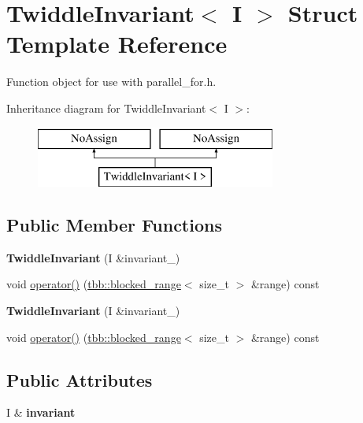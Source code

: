 \hypertarget{structTwiddleInvariant}{}\section{Twiddle\+Invariant$<$ I $>$ Struct Template Reference}
\label{structTwiddleInvariant}


Function object for use with parallel\+\_\+for.\+h.  


Inheritance diagram for Twiddle\+Invariant$<$ I $>$\+:\begin{figure}[H]
\begin{center}
\leavevmode
\includegraphics[height=2.000000cm]{structTwiddleInvariant}
\end{center}
\end{figure}
\subsection*{Public Member Functions}
\begin{DoxyCompactItemize}
\item 
\hypertarget{structTwiddleInvariant_a469aa6624960e921da20bd5e9f80ea54}{}{\bfseries Twiddle\+Invariant} (I \&invariant\+\_\+)\label{structTwiddleInvariant_a469aa6624960e921da20bd5e9f80ea54}

\item 
void \hyperlink{structTwiddleInvariant_a335881a986825fa297102d9c8f56da72}{operator()} (\hyperlink{classtbb_1_1blocked__range}{tbb\+::blocked\+\_\+range}$<$ size\+\_\+t $>$ \&range) const 
\item 
\hypertarget{structTwiddleInvariant_a469aa6624960e921da20bd5e9f80ea54}{}{\bfseries Twiddle\+Invariant} (I \&invariant\+\_\+)\label{structTwiddleInvariant_a469aa6624960e921da20bd5e9f80ea54}

\item 
void \hyperlink{structTwiddleInvariant_a335881a986825fa297102d9c8f56da72}{operator()} (\hyperlink{classtbb_1_1blocked__range}{tbb\+::blocked\+\_\+range}$<$ size\+\_\+t $>$ \&range) const 
\end{DoxyCompactItemize}
\subsection*{Public Attributes}
\begin{DoxyCompactItemize}
\item 
\hypertarget{structTwiddleInvariant_aebecc93ecd9b3cdd462218b63b8cd559}{}I \& {\bfseries invariant}\label{structTwiddleInvariant_aebecc93ecd9b3cdd462218b63b8cd559}

\end{DoxyCompactItemize}


